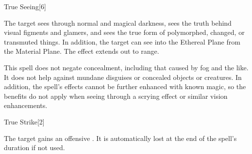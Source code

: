 \begin{spellsection}{True Seeing}[6]
    \begin{spellheader}
    \end{spellheader}
    \begin{spellcontent}
        \begin{spelltargetinginfo}
        \end{spelltargetinginfo}
        \begin{spelleffects}
            \spelleffect The target sees through normal and magical darkness, sees the truth behind visual figments and glamers, and sees the true form of polymorphed, changed, or transmuted things. In addition, the target can see into the Ethereal Plane from the Material Plane. The effect extends out to \rngmed range.
            \spelldur \durshort
        \end{spelleffects}
    \end{spellcontent}
    \begin{spellfooter}
        \spellnotes This spell does not negate concealment, including that caused by fog and the like. It does not help against mundane disguises or concealed objects or creatures. In addition, the spell's effects cannot be further enhanced with known magic, so the benefits do not apply when seeing through a scrying effect or similar vision enhancements.
        \miscastexplode
    \end{spellfooter}
\end{spellsection}

\begin{spellsection}{True Strike}[2]
    \begin{spellheader}
    \end{spellheader}
    \begin{spellcontent}
        \begin{spelltargetinginfo}
        \end{spelltargetinginfo}
        \begin{spelleffects}
            \spelleffect The target gains an offensive . It is automatically lost at the end of the spell's duration if not used.
            \spelldur \durshort
        \end{spelleffects}
    \end{spellcontent}
    \begin{spellfooter}
        \miscastrandom
    \end{spellfooter}
\end{spellsection}

